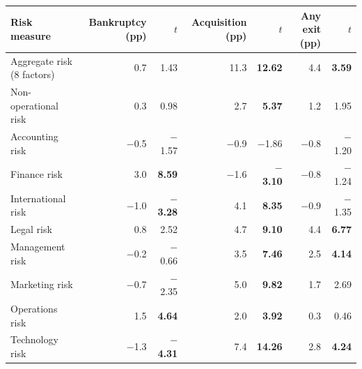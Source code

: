 \begin{tabular}{lrrrrrr}
\toprule
Risk measure & Bankruptcy (pp) & $t$ & Acquisition (pp) & $t$ & Any exit (pp) & $t$ \\
\midrule
Aggregate risk (8 factors) & 0.7 & 1.43 & 11.3 & \textbf{12.62} & 4.4 & \textbf{3.59} \\
Non-operational risk & 0.3 & 0.98 & 2.7 & \textbf{5.37} & 1.2 & 1.95 \\
Accounting risk & \ensuremath{-}0.5 & \ensuremath{-}1.57 & \ensuremath{-}0.9 & \ensuremath{-}1.86 & \ensuremath{-}0.8 & \ensuremath{-}1.20 \\
Finance risk & 3.0 & \textbf{8.59} & \ensuremath{-}1.6 & \textbf{\ensuremath{-}3.10} & \ensuremath{-}0.8 & \ensuremath{-}1.24 \\
International risk & \ensuremath{-}1.0 & \textbf{\ensuremath{-}3.28} & 4.1 & \textbf{8.35} & \ensuremath{-}0.9 & \ensuremath{-}1.35 \\
Legal risk & 0.8 & 2.52 & 4.7 & \textbf{9.10} & 4.4 & \textbf{6.77} \\
Management risk & \ensuremath{-}0.2 & \ensuremath{-}0.66 & 3.5 & \textbf{7.46} & 2.5 & \textbf{4.14} \\
Marketing risk & \ensuremath{-}0.7 & \ensuremath{-}2.35 & 5.0 & \textbf{9.82} & 1.7 & 2.69 \\
Operations risk & 1.5 & \textbf{4.64} & 2.0 & \textbf{3.92} & 0.3 & 0.46 \\
Technology risk & \ensuremath{-}1.3 & \textbf{\ensuremath{-}4.31} & 7.4 & \textbf{14.26} & 2.8 & \textbf{4.24} \\
\bottomrule
\end{tabular}
